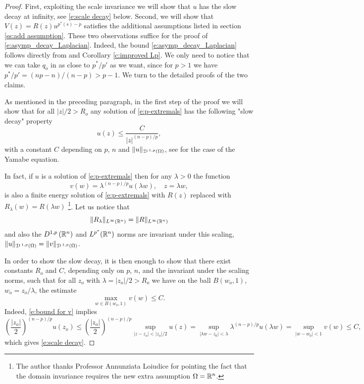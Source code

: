 \documentclass[10pt]{amsart}
\begin{document}
\begin{proof}
 First, exploiting the scale invariance we will show that $u$ has the slow decay at infinity, see \eqref{e:scale decay} below. Second, we will show that $V(z)=R(z)u^{p^*(s)-p}$ satisfies the additional assumptions listed in section \ref{ss:add assumption}. These two observations suffice for the proof of \eqref{e:asymp_decay_Laplacian}. Indeed, the bound \eqref{e:asymp_decay_Laplacian} follows directly from \cite[Theorem 2.5]{V11}  and Corollary \ref{c:improved Lp}. We only need to notice that we can take $q_o$ in \cite[Theorem 2.9]{V11} as close to $p^*/p'$ as we want, since for $p>1$ we have  $p^*/p'=(np-n)/(n-p)>p-1$. We turn to the detailed proofs of the two claims.

 As mentioned in the preceding paragraph, in the first step of the proof we will show that for all $|z|/2>R_o$ any solution of \eqref{e:p-extremals} has the following "slow decay" property
\begin{equation}\label{e:scale decay}
u(z)\leq \frac {C}{|z|^{(n-p)/p}},
\end{equation}
with a constant $C$ depending on $p$, $n$ and $\lVert u\rVert_{{\mathcal{D}}\,^{1,p}(\Omega)}$, see \cite{Z} for the case of the Yamabe equation.

 In fact, if $u$ is a solution of \eqref{e:p-extremals} then for any $\lambda>0$ the function
\begin{equation}\label{e:scaled function}
v(w)=\lambda^{(n-p)/p}u(\lambda w), \quad z=\lambda w,
\end{equation}
is also a finite energy solution of \eqref{e:p-extremals} with $R(z)$ replaced with $R_\lambda(w)=R(\lambda w)$  \footnote{ The author thanks Professor Annunziata Loiudice for pointing  the fact that the domain invariance requires the new extra assumption $\Omega=\mathbb{R}^n$.}. Let us notice that $$\lVert R_{\lambda}\rVert_{L^\infty(\mathbb{R}^n)}=\lVert R\rVert_{L^\infty(\mathbb{R}^n)}$$ and also the $D^{1,p}\,(\mathbb{R}^n)$ and $L^{p^*}(\mathbb{R}^n)$ norms are invariant under this scaling, $\lVert u\rVert_{{\mathcal{D}}\,^{1,p}(\Omega)}=\lVert v\rVert_{{\mathcal{D}}\,^{1,p}(\Omega)}$.

In order to show the slow decay, it is then enough to show that there exist constants $R_o$ and    $C$, depending only on $p$, $n$, and the invariant under the scaling norms, such that for all $z_o$ with  $\lambda=|z_o|/2>R_o$   we have on the ball $B(w_o,1)$, $w_o=z_o/\lambda$, the estimate
\begin{equation}\label{e:bound for v}
\max_{w\in B(w_o,1)}v(w) \leq C.
\end{equation}
Indeed, \eqref{e:bound for v} implies
\[
\left(\frac {|z_o|}{2}\right)^{(n-p)/p}u(z_o)\leq \left(\frac {|z_o|}{2}\right)^{(n-p)/p}\sup_{|z-z_o|<|z_o|/2 } u( z)=\sup_{\left\vert \lambda w-z_0 \right\vert<\lambda}\lambda^{(n-p)/p} u(\lambda w) =\sup_{\left\vert w-w_0 \right\vert<1}v(w)\leq C,
\]
which gives \eqref{e:scale decay}.



\end{proof}
\end{document}
